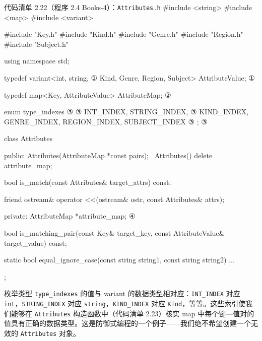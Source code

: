 \begin{codeboxt}{代码清单 2.22（程序 2.4 Books-4）：\texttt{Attributes.\allowbreak{}h}}
#include <string>
#include <map>
#include <variant>

#include "Key.h"
#include "Kind.h"
#include "Genre.h"
#include "Region.h"
#include "Subject.h"

using namespace std;

typedef variant<int, string,                                   ①
               Kind, Genre, Region, Subject> AttributeValue;   ①

typedef map<Key, AttributeValue> AttributeMap;                 ②

enum type_indexes                                              ③
{                                                              ③
    INT_INDEX, STRING_INDEX,                                   ③
    KIND_INDEX, GENRE_INDEX, REGION_INDEX, SUBJECT_INDEX       ③
};                                                             ③

class Attributes
{
public:
    Attributes(AttributeMap *const pairs);
    ~Attributes() { delete attribute_map; }

    bool is_match(const Attributes& target_attrs) const;

    friend ostream& operator <<(ostream& ostr,
                                const Attributes& attrs);

private:
    AttributeMap *attribute_map;                               ④

    bool is_matching_pair(const Key& target_key,
                          const AttributeValue& target_value) const;

    static bool equal_ignore_case(const string string1,
                                  const string string2) ...
};
\end{codeboxt}
\par
{}\par
{}\par
{}\par

枚举类型 \texttt{type\_\allowbreak{}indexes} 的值与 variant 的数据类型相对应：\texttt{INT\_\allowbreak{}INDEX} 对应 \texttt{int}，\texttt{STRING\_\allowbreak{}INDEX} 对应 \texttt{string}，\texttt{KIND\_\allowbreak{}INDEX} 对应 \texttt{Kind}，等等。这些索引使我们能够在 \texttt{Attributes} 构造函数中（代码清单 2.23）核实 map 中每个键—值对的值具有正确的数据类型。这是防御式编程的一个例子——我们绝不希望创建一个无效的 \texttt{Attributes} 对象。

